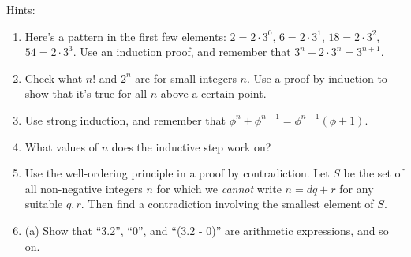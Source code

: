 \documentclass[a4paper,12pt]{article}
\begin{document}
\newpage

Hints:
\begin{enumerate}
\item
Here's a pattern in the first few elements:
$2 = 2 \cdot 3^0$, $6 = 2 \cdot 3^1$, $18 = 2 \cdot 3^2$, $54 = 2 \cdot 3^3$.
Use an induction proof, and remember that $3^n + 2 \cdot 3^n = 3^{n+1}$.
\item
Check what $n!$ and $2^n$ are for small integers $n$. Use a proof by induction
to show that it's true for all $n$ above a certain point.
\item
Use strong induction, and remember that
$\phi^n + \phi^{n-1} = \phi^{n-1} (\phi + 1)$.
\item
What values of $n$ does the inductive step work on?
\item
Use the well-ordering principle in a proof by contradiction.
Let $S$ be the set of all non-negative integers $n$ for which we {\em cannot}
write $n = dq+r$ for any suitable $q, r$. Then find a contradiction
involving the smallest element of $S$.
\item
(a) Show that ``3.2'', ``0'', and ``(3.2 - 0)'' are arithmetic expressions, and so on.


\end{enumerate}
\end{document}
